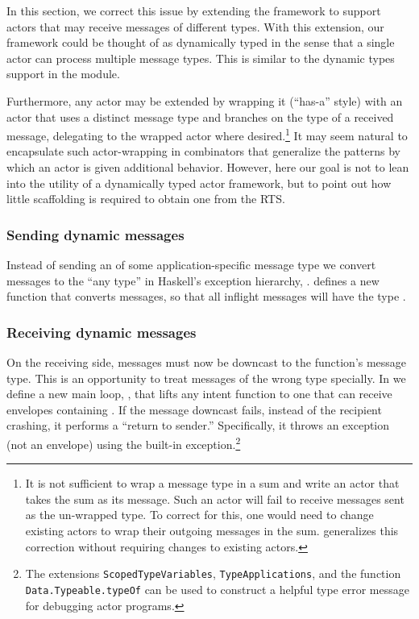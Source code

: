\documentclass[sigplan,screen]{acmart}
\begin{document}
In this section, we correct this issue by extending the framework to support
actors that may receive messages of different types.
%
With this extension, our framework could be thought of as dynamically typed in
the sense that a single actor can process multiple message types.
%
This is similar to the dynamic types support in the
 module.


Furthermore, any actor may be extended by wrapping it (``has-a'' style) with an
actor that uses a distinct message type and branches on the type of a received
message, delegating to the wrapped actor where desired.\footnote{
    It is not sufficient to wrap a message type in a sum and write an actor
    that takes the sum as its message.
    Such an actor will fail to receive messages sent as the un-wrapped type.
    To correct for this, one would need to change existing actors to wrap their
    outgoing messages in the sum.
     generalizes this
    correction without requiring changes to existing actors.
}
%
It may seem natural to encapsulate such actor-wrapping in combinators that
generalize the patterns by which an actor is given additional behavior.
%
However, here our goal is not to lean into the utility of a dynamically
typed actor framework, but to point out how little scaffolding is required to
obtain one from the RTS.


\subsubsection{Sending dynamic messages}


Instead of sending an 
of some application-specific message type
we convert messages to the ``any type''
in Haskell's exception hierarchy,
 \cite{marlow2006extensible}.
%
 defines a new  function that converts messages,
so that all inflight messages will have the type .


\subsubsection{Receiving dynamic messages}
\label{sec:dynamic-recv-loop}


On the receiving side, messages must now be downcast to the 
function's message type.
%
This is an opportunity to treat messages of the wrong type specially.
%
In  we define a new main loop, ,
that lifts any intent function to one that can
receive envelopes containing .
%
If the message downcast fails, instead of the recipient crashing, it performs a
``return to sender.''
%
Specifically, it throws an exception (not an envelope) using the built-in
 exception.\footnote{
    The extensions \texttt{ScopedTypeVariables}, \texttt{TypeApplications}, and
    the function \texttt{Data.Typeable.typeOf} can be used to construct a
    helpful type error message for debugging actor programs.
}
\end{document}
